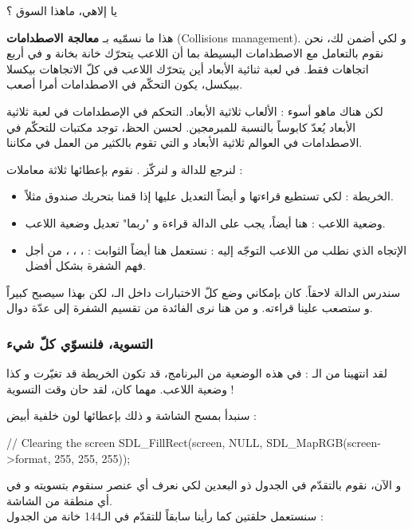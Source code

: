 \begin{question}
يا إلاهي، ماهذا السوق ؟
\end{question}

هذا ما نسمّيه بـ
\textbf{معالجة الاصطدامات}
(\textenglish{Collisions management}).
و لكي أضمن لك، نحن نقوم بالتعامل مع الاصطدامات البسيطة بما أن اللاعب يتحرّك خانة بخانة و في أربع اتجاهات فقط. في لعبة ثنائية الأبعاد أين يتحرّك اللاعب في كلّ الاتجاهات بيكسلا ببيكسل، يكون التحكّم في الاصطدامات أمرا أصعب. 

لكن هناك ماهو أسوء : الألعاب ثلاثية الأبعاد. التحكم في الإصطدامات في لعبة ثلاثية الأبعاد يُعدّ كابوساً بالنسبة للمبرمجين. لحسن الحظ، توجد مكتبات للتحكّم في الاصطدامات في العوالم ثلاثية الأبعاد و التي تقوم بالكثير من العمل في مكاننا.

لنرجع للدالة
و لنركّز . نقوم بإعطائها ثلاثة معاملات :

\begin{itemize}
	\item الخريطة : لكي تستطيع قراءتها و أيضاً التعديل عليها إذا قمنا بتحريك صندوق مثلاً.
	\item وضعية اللاعب : هنا أيضاً، يجب على الدالة قراءة و "ربما" تعديل وضعية اللاعب.
	\item الإتجاه الذي نطلب من اللاعب التوجّه إليه : نستعمل هنا أيضاً الثوابت :
	، ، ، 
	من أجل فهم الشفرة بشكل أفضل.
\end{itemize}

سندرس الدالة
لاحقاً. كان بإمكاني وضع كلّ الاختبارات داخل الـ،
لكن بهذا سيصبح كبيراً و ستصعب علينا قراءته. و من هنا نرى الفائدة من تقسيم الشفرة إلى عدّة دوال.

\subsubsection{التسوية، فلنسوّي كلّ شيء}

لقد انتهينا من الـ :
في هذه الوضعية من البرنامج، قد تكون الخريطة قد تغيّرت و كذا وضعية اللاعب. مهما كان، لقد حان وقت التسوية !

سنبدأ بمسح الشاشة و ذلك بإعطائها لون خلفية أبيض :

\begin{Csource}
// Clearing the screen
SDL_FillRect(screen, NULL, SDL_MapRGB(screen->format, 255, 255, 255));
\end{Csource}

و الآن، نقوم بالتقدّم في الجدول ذو البعدين 
لكي نعرف أي عنصر سنقوم بتسويته و في أي منطقة من الشاشة.\\
سنستعمل حلقتين كما رأينا سابقاً للتقدّم في الـ144 خانة من الجدول :

